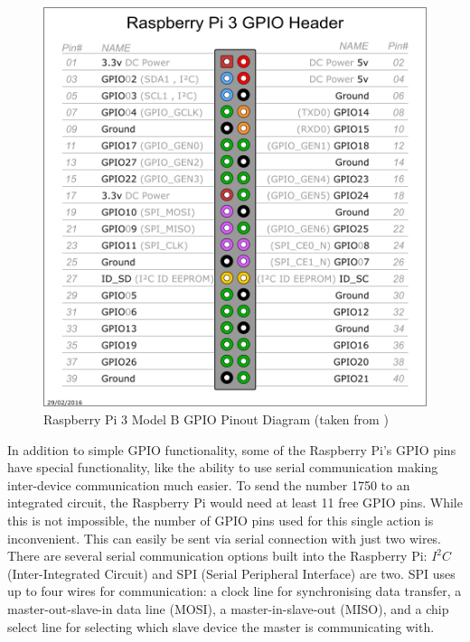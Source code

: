 \documentclass[twoside,a4]{report}
\begin{document}
	\begin{figure}[!htb]
		\centering
		\includegraphics[scale=0.2]{images/gpiopinout.png}
		\caption{Raspberry Pi 3 Model B GPIO Pinout Diagram (taken from  \cite{pigpiopinout})}
		\label{gpiopinout}
	\end{figure}
	
	\noindent
	In addition to simple GPIO functionality, some of the Raspberry Pi's GPIO pins have special functionality, like the ability to use serial communication making inter-device communication much easier. To send the number 1750 to an integrated circuit, the Raspberry Pi would need at least 11 free GPIO pins. While this is not impossible, the number of GPIO pins used for this single action is inconvenient. This can easily be sent via serial connection with just two wires. There are several serial communication options built into the Raspberry Pi: $I^2C$ (Inter-Integrated Circuit) and SPI (Serial Peripheral Interface) are two. SPI uses up to four wires for communication: a clock line for synchronising data transfer, a master-out-slave-in data line (MOSI), a master-in-slave-out (MISO), %
	and a chip select line for selecting which slave device the master is communicating with.
	
\end{document}
